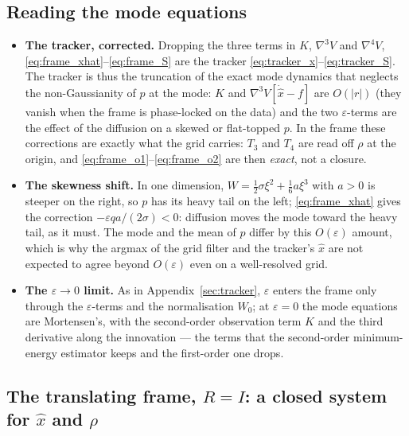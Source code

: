 \documentclass[11pt,a4paper]{article}
\newcommand{\xh}{\hat{x}}
\newcommand{\eps}{\varepsilon}
\newcommand{\abs}[1]{\left\lvert #1 \right\rvert}
\newcommand{\grad}{\nabla}
\theoremstyle{plain}
\theoremstyle{definition}
\theoremstyle{remark}
\begin{document}
\subsection{Reading the mode equations}

\begin{itemize}[leftmargin=1.5em]
  \item \textbf{The tracker, corrected.} Dropping the three terms in $K$, $\grad^3V$ and $\grad^4V$, \eqref{eq:frame_xhat}--\eqref{eq:frame_S} are the tracker \eqref{eq:tracker_x}--\eqref{eq:tracker_S}. The tracker is thus the truncation of the exact mode dynamics that neglects the non-Gaussianity of $p$ at the mode: $K$ and $\grad^3V[\dot{\xh}-f]$ are $O(\abs r)$ (they vanish when the frame is phase-locked on the data) and the two $\eps$-terms are the effect of the diffusion on a skewed or flat-topped $p$. In the frame these corrections are exactly what the grid carries: $T_3$ and $T_4$ are read off $\rho$ at the origin, and \eqref{eq:frame_o1}--\eqref{eq:frame_o2} are then \emph{exact}, not a closure.
  \item \textbf{The skewness shift.} In one dimension, $W = \tfrac12\sigma\xi^2 + \tfrac16a\xi^3$ with $a>0$ is steeper on the right, so $p$ has its heavy tail on the left; \eqref{eq:frame_xhat} gives the correction $-\eps qa/(2\sigma)<0$: diffusion moves the mode toward the heavy tail, as it must. The mode and the mean of $p$ differ by this $O(\eps)$ amount, which is why the argmax of the grid filter and the tracker's $\xh$ are not expected to agree beyond $O(\eps)$ even on a well-resolved grid.
  \item \textbf{The $\eps\to0$ limit.} As in Appendix~\ref{sec:tracker}, $\eps$ enters the frame only through the $\eps$-terms and the normalisation $W_0$; at $\eps=0$ the mode equations are Mortensen's, with the second-order observation term $K$ and the third derivative along the innovation --- the terms that the second-order minimum-energy estimator keeps and the first-order one drops.
\end{itemize}

\subsection{The translating frame, \texorpdfstring{$R=I$}{R = I}: a closed system for \texorpdfstring{$\xh$}{xhat} and \texorpdfstring{$\rho$}{rho}}
\label{sec:frame_translate}
\end{document}
